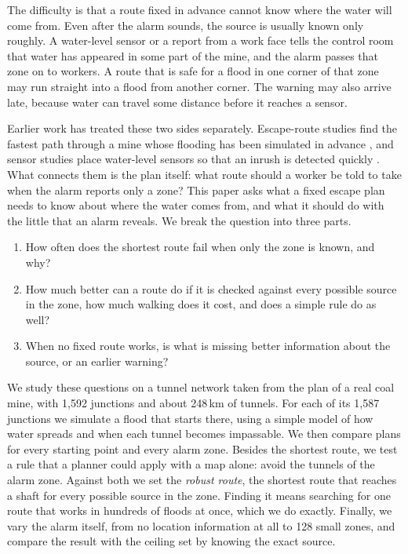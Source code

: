 \documentclass[11pt,a4paper]{article}
\begin{document}
The difficulty is that a route fixed in advance cannot know where the water will come from. Even after the alarm sounds, the source is usually known only roughly. A water-level sensor or a report from a work face tells the control room that water has appeared in some part of the mine, and the alarm passes that zone on to workers. A route that is safe for a flood in one corner of that zone may run straight into a flood from another corner. The warning may also arrive late, because water can travel some distance before it reaches a sensor.

Earlier work has treated these two sides separately. Escape-route studies find the fastest path through a mine whose flooding has been simulated in advance \cite{wu2020}, and sensor studies place water-level sensors so that an inrush is detected quickly \cite{wu2021}. What connects them is the plan itself: what route should a worker be told to take when the alarm reports only a zone? This paper asks what a fixed escape plan needs to know about where the water comes from, and what it should do with the little that an alarm reveals. We break the question into three parts.
\begin{enumerate}
\item How often does the shortest route fail when only the zone is known, and why?
\item How much better can a route do if it is checked against every possible source in the zone, how much walking does it cost, and does a simple rule do as well?
\item When no fixed route works, is what is missing better information about the source, or an earlier warning?
\end{enumerate}

We study these questions on a tunnel network taken from the plan of a real coal mine, with 1,592 junctions and about 248\,km of tunnels. For each of its 1,587 junctions we simulate a flood that starts there, using a simple model of how water spreads and when each tunnel becomes impassable. We then compare plans for every starting point and every alarm zone. Besides the shortest route, we test a rule that a planner could apply with a map alone: avoid the tunnels of the alarm zone. Against both we set the \emph{robust route}, the shortest route that reaches a shaft for every possible source in the zone. Finding it means searching for one route that works in hundreds of floods at once, which we do exactly. Finally, we vary the alarm itself, from no location information at all to 128 small zones, and compare the result with the ceiling set by knowing the exact source.
\end{document}
